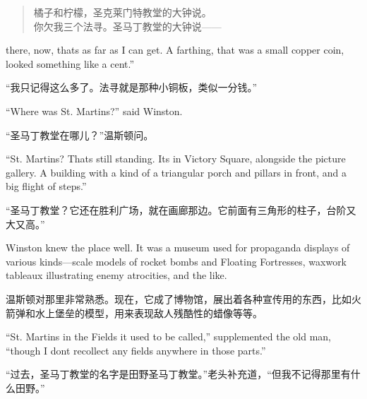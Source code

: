 \begin{paracol}{2}
\switchcolumn

\begin{quotation}
\noindent 橘子和柠檬，圣克莱门特教堂的大钟说。\\
你欠我三个法寻。圣马丁教堂的大钟说——
\end{quotation}

\switchcolumn*

there, now, that\textquotesingle s as far as I can get. A farthing, that
was a small copper coin, looked something like a cent.''

\switchcolumn

``我只记得这么多了。法寻就是那种小铜板，类似一分钱。''

\switchcolumn*

``Where was St. Martin\textquotesingle s?'' said Winston.

\switchcolumn

``圣马丁教堂在哪儿？''温斯顿问。

\switchcolumn*

``St. Martin\textquotesingle s? That\textquotesingle s still standing.
It\textquotesingle s in Victory Square, alongside the picture gallery. A
building with a kind of a triangular porch and pillars in front, and a
big flight of steps.''

\switchcolumn

``圣马丁教堂？它还在胜利广场，就在画廊那边。它前面有三角形的柱子，台阶又大又高。''

\switchcolumn*

Winston knew the place well. It was a museum used for propaganda
displays of various kinds---scale models of rocket bombs and Floating
Fortresses, waxwork tableaux illustrating enemy atrocities, and the
like.

\switchcolumn

温斯顿对那里非常熟悉。现在，它成了博物馆，展出着各种宣传用的东西，比如火箭弹和水上堡垒的模型，用来表现敌人残酷性的蜡像等等。

\switchcolumn*

``St. Martin\textquotesingle s in the Fields it used to be called,''
supplemented the old man, ``though I don\textquotesingle t recollect any
fields anywhere in those parts.''

\switchcolumn

``过去，圣马丁教堂的名字是田野圣马丁教堂。''老头补充道，``但我不记得那里有什么田野。''

\switchcolumn*


\end{paracol}

